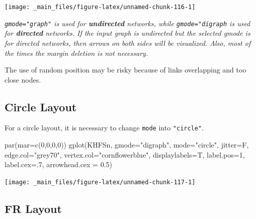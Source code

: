 \documentclass[
  notitlepage,
  onecolumn,
  openany]{book}
\newenvironment{Shaded}{\begin{snugshade}}{\end{snugshade}}
\newcommand{\AttributeTok}[1]{\textcolor[rgb]{0.77,0.63,0.00}{#1}}
\newcommand{\DecValTok}[1]{\textcolor[rgb]{0.00,0.00,0.81}{#1}}
\newcommand{\FloatTok}[1]{\textcolor[rgb]{0.00,0.00,0.81}{#1}}
\newcommand{\FunctionTok}[1]{\textcolor[rgb]{0.00,0.00,0.00}{#1}}
\newcommand{\NormalTok}[1]{#1}
\newcommand{\StringTok}[1]{\textcolor[rgb]{0.31,0.60,0.02}{#1}}
\begin{document}
\begin{center}\texttt{[image: \_main\_files/figure-latex/unnamed-chunk-116-1]} \end{center}

\emph{\texttt{gmode="graph"} is used for \textbf{undirected} networks, while \texttt{gmode="digraph} is used for \textbf{directed} networks. If the input graph is undirected but the selected gmode is for directed networks, then arrows on both sides will be visualized. Also, most of the times the margin deletion is not necessary.}

The use of random position may be risky because of links overlapping and too close nodes.

\hypertarget{circle-layout}{%
\subsection{Circle Layout}\label{circle-layout}}

For a circle layout, it is necessary to change \texttt{mode} into \texttt{"circle"}.

\begin{Shaded}
\begin{Highlighting}[]
\FunctionTok{par}\NormalTok{(}\AttributeTok{mar=}\FunctionTok{c}\NormalTok{(}\DecValTok{0}\NormalTok{,}\DecValTok{0}\NormalTok{,}\DecValTok{0}\NormalTok{,}\DecValTok{0}\NormalTok{))}
\FunctionTok{gplot}\NormalTok{(KHFSn, }
      \AttributeTok{gmode=}\StringTok{"digraph"}\NormalTok{,}
      \AttributeTok{mode=}\StringTok{"circle"}\NormalTok{,}
      \AttributeTok{jitter=}\NormalTok{F,}
      \AttributeTok{edge.col=}\StringTok{"grey70"}\NormalTok{,}
      \AttributeTok{vertex.col=}\StringTok{"cornflowerblue"}\NormalTok{,}
      \AttributeTok{displaylabels=}\NormalTok{T,}
      \AttributeTok{label.pos=}\DecValTok{1}\NormalTok{,}
      \AttributeTok{label.cex=}\NormalTok{.}\DecValTok{7}\NormalTok{,}
      \AttributeTok{arrowhead.cex =} \FloatTok{0.5}\NormalTok{)}
\end{Highlighting}
\end{Shaded}

\begin{center}\texttt{[image: \_main\_files/figure-latex/unnamed-chunk-117-1]} \end{center}

\hypertarget{fr-layout}{%
\subsection{FR Layout}\label{fr-layout}}
\end{document}
